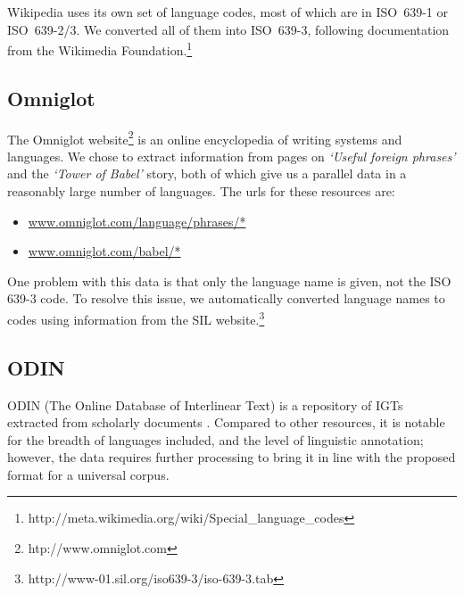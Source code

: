 Wikipedia uses its own set of language codes, most of which are in ISO~639-1 or ISO~639-2/3. We converted all of them into ISO~639-3, following documentation from the Wikimedia Foundation.\footnote{http://meta.wikimedia.org/wiki/Special\_language\_codes}


\subsection{Omniglot}


The Omniglot website\footnote{htp://www.omniglot.com} is an online encyclopedia of writing systems and languages. We chose to extract information from pages on \emph{`Useful foreign phrases'} and the \emph{`Tower of Babel'} story, both of which give us a parallel data in a reasonably large number of languages. The urls for these resources are:

\begin{itemize}[noitemsep]
\item \url{www.omniglot.com/language/phrases/*} 
\item \url{www.omniglot.com/babel/*}
\end{itemize}

\noindent One problem with this data is that only the language name is given, not the ISO 639-3 code. To resolve this issue, we automatically converted language names to codes using information from the SIL website.\footnote{http://www-01.sil.org/iso639-3/iso-639-3.tab}



\subsection{ODIN}


ODIN (The Online Database of Interlinear Text) is a repository of IGTs extracted from scholarly documents \cite{lewis2006odin,lewis2010odin}.  Compared to other resources, it is notable for the breadth of languages included, and the level of linguistic annotation; however, the data requires further processing to bring it in line with the proposed format for a universal corpus.

